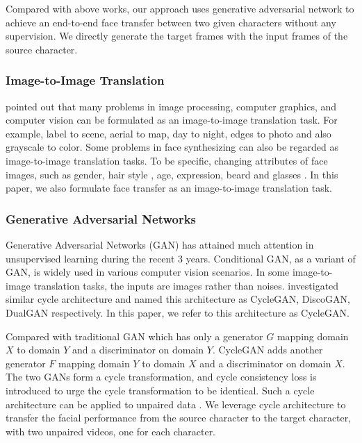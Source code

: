 \documentclass[letterpaper]{article} %
\begin{document}
	Compared with above works, our approach uses generative adversarial network to achieve an end-to-end face transfer between two given characters without any supervision. We directly generate the target frames with the input frames of the source character.
	
	
	\subsubsection{Image-to-Image Translation}
	\cite{isola2016image} pointed out that many problems in image processing, computer graphics, and computer vision can be formulated as an image-to-image translation task. For example, label to scene, aerial to map, day to night, edges to photo and also grayscale to color. Some problems in face synthesizing can also be regarded as image-to-image translation tasks. To be specific, changing attributes of face images, such as gender, hair style \cite{kim2017unsupervised}, age, expression, beard and glasses \cite{shen2016learning}. In this paper, we also formulate face transfer as an image-to-image translation task.
	
	
	\subsubsection{Generative Adversarial Networks}
	Generative Adversarial Networks (GAN) \cite{goodfellow2014generative} has attained much attention in unsupervised learning during the recent 3 years. Conditional GAN, as a variant of GAN, is widely used in various computer vision scenarios. In some image-to-image translation tasks, the inputs are images rather than noises. \cite{zhu2017unpaired,kim2017unsupervised,yi2017dualgan} investigated similar cycle architecture and named this architecture as CycleGAN, DiscoGAN, DualGAN respectively. In this paper, we refer to this architecture as CycleGAN. 
	
	Compared with traditional GAN which has only a generator $G$ mapping domain $X$ to domain $Y$ and a discriminator on domain $Y$. CycleGAN adds another generator $F$ mapping domain $Y$ to domain $X$ and a discriminator on domain $X$. The two GANs form a cycle transformation, and cycle consistency loss is introduced to urge the cycle transformation to be identical. Such a cycle architecture can be applied to unpaired data \cite{zhu2017unpaired}. 
	We leverage cycle architecture to transfer the facial performance from the source character to the target character, with two unpaired videos, one for each character.
	
\end{document}
